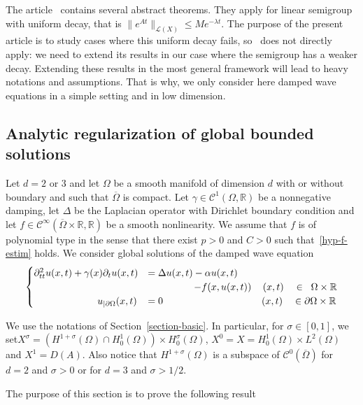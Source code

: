 \documentclass[10pt]{amsart}
\theoremstyle{definition}\newtheorem{defi}[theo]{Definition}\newtheorem{rema}[theo]{Remark}\newtheorem{exam}[theo]{Example}\newtheorem{exem}[theo]{Example}\newtheorem{nota}[theo]{Notation}
\newcommand{\RR}{\mathbb{R}}
\newcommand{\Cc}{\mathcal{C}}
\newcommand{\Lc}{\mathcal{L}}
\begin{document}
The article~\cite{Hale-Raugel} contains several abstract theorems. They apply for linear semigroup with uniform decay, that is $\|e^{At}\|_{\Lc(X)}\leq M e^{-\lambda t}$. The purpose of the present article is to study cases where this uniform decay fails, so~\cite{Hale-Raugel} does not directly apply: we need to extend its results in our case where the semigroup has a weaker decay. Extending these results in the most general framework will lead to heavy notations and assumptions. That is why, we only consider here damped wave equations in a simple setting and in low dimension.

\subsection{Analytic regularization of global bounded solutions}
Let $d=2$ or $3$ and let $\Omega$ be a smooth manifold of dimension $d$ with or without boundary and such that $\overline\Omega$ is compact. Let $\gamma\in \Cc^1(\Omega,\RR)$ be a nonnegative damping, let $\Delta$ be the Laplacian operator with Dirichlet boundary condition and let $f\in\Cc^\infty(\overline\Omega\times\RR,\RR)$ be a smooth nonlinearity. We assume that $f$ is of polynomial type in the sense that there exist $p>0$ and $C>0$ such that~\eqref{hyp-f-estim} holds. We consider global solutions of the damped wave equation
\begin{equation}\label{eq-analytic}
\begin{cases}
\partial_{tt}^2 u(x,t) + \gamma(x)\partial_t u(x,t) &= \Delta u(x,t) - \alpha u(x,t)\\
& \mkern 85mu - f(x,u(x,t))\quad\,(x,t)\quad\in\;\;\Omega\times \RR\\
\mkern117mu u_{|\partial\Omega}(x,t)&= 0\;\mkern177mu(x,t)\quad\in\partial\Omega\times \RR
\end{cases}
\end{equation}

We use the notations of Section~\ref{section-basic}. In particular, for $\sigma\in[0,1]$, we set\linebreak$X^{\sigma}=(H^{1+\sigma}(\Omega)\cap H^1_0(\Omega))\times H^{\sigma}_0(\Omega)$, $X^0=X=H^1_0(\Omega)\times L^2(\Omega)$ and $X^1=D(A)$. Also notice that $H^{1+\sigma}(\Omega)$ is a subspace of $\Cc^0(\overline\Omega)$ for $d=2$ and $\sigma>0$ or for $d=3$ and $\sigma>1/2$.

The purpose of this section is to prove the following result
\end{document}
